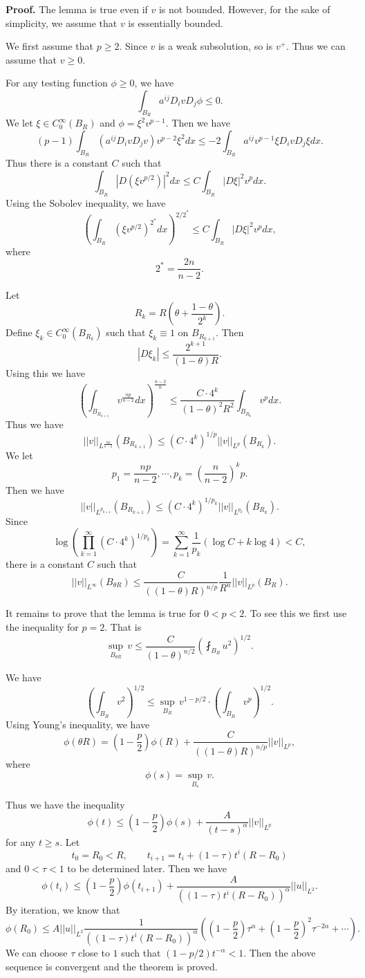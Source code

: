 {\bf Proof.} The lemma is true even if $v$ is not bounded. However, for the sake of simplicity, we assume that $v$ is essentially bounded.

We first assume that $p\geq 2$. Since $v$ is a weak subsolution, so is $v^+$. Thus we can assume that $v\geq 0$.

For any testing function $\phi\geq 0$, we have
\[
\int_{B_R} a^{ij}D_ivD_j\phi \leq 0.
\]
We let $\xi\in C_0^\infty(B_R)$ and $\phi=\xi^2v^{p-1}$. Then we have
\[
(p-1)\int_{B_R}(a^{ij} D_i v D_j v)v^{p-2}\xi^2 dx
\leq -2\int_{B_R}a^{ij} v^{p-1}\xi D_i v D_j\xi dx.
\]
Thus there is a constant $C$ such that
\[
\int_{B_R}|D(\xi v^{p/2})|^2 dx\leq C\int_{B_R}|D\xi|^2v^p dx.
\]
Using the Sobolev inequality, we have
\[
\left(\int_{B_R}(\xi v^{p/2})^{2^*} dx\right)^{2/2^*}\leq C\int_{B_R}|D\xi|^2 v^p dx,
\]
where 
\[
2^*=\frac{2n}{n-2}.
\]

Let 
\[
R_k=R\left(\theta+\frac{1-\theta}{2^k}\right).
\]
Define
$\xi_k\in C_0^\infty(B_{R_k})$ such that $\xi_k\equiv 1$ on $B_{R_{k+1}}$. Then
\[
|D\xi_k|\leq\frac{2^{k+1}}{(1-\theta) R}.
\]
Using this we have
\[
\left(\int_{B_{R_{k+1}}}v^{\frac{np}{n-2}}dx\right)^{\frac{n-2}{n}}\leq\frac{C\cdot 4^k}{(1-\theta)^2R^2}\int_{B_{R_k}}v^p dx.
\]
Thus we have
\[
||v||_{L^{\frac{np}{n-2}}}(B_{R_{k+1}})\leq (C\cdot 4^k)^{1/p}||v||_{L^p}(B_{R_k}).
\]
We let
\[
p_1=\frac{np}{n-2},\cdots, p_k=\left(\frac{n}{n-2}\right)^k p.
\]
Then we have
\[
||v||_{L^{p_{k+1}}}(B_{R_{k+1}})\leq (C\cdot 4^k)^{1/p_k}||v||_{L^{p_k}}(B_{R_k}).
\]
Since 
\[
\log\left(\prod_{k=1}^\infty (C\cdot 4^k)^{1/p_k}\right)
=\sum_{k=1}^\infty\frac{1}{p_k}(\log C+k\log 4)<C,
\]
there is a constant $C$ such that
\[
||v||_{L^\infty}(B_{\theta R})\leq\frac{C}{((1-\theta)R)^{n/p}}\frac{1}{R^n}||v||_{L^p}(B_R).
\]

It remains to prove that the lemma is true for $0<p<2$. To see this we first use the inequality for $p=2$. That is
\[
\sup_{B_{\theta R}}\, v\leq\frac{C}{(1-\theta)^{n/2}}\left(\fint_{B_R}u^2\right)^{1/2}.
\]

We have
\[
\left(\int_{B_R}v^2\right)^{1/2}\leq\sup_{B_R}\, v^{1-p/2}\cdot\left(\int_{B_R}v^p\right)^{1/2}.
\]
Using Young's inequality, we have
\[
\phi(\theta R)=(1-\frac p2)\phi(R)+\frac{C}{((1-\theta)R)^{n/p}}||v||_{L^p},
\]
where 
\[
\phi(s)=\sup_{B_s}\, v.
\]

Thus we have the inequality
\[
\phi(t)\leq (1-\frac p2)\phi(s)+\frac{A}{(t-s)^\alpha}||v||_{L^p}
\]
for any $t\geq s$. Let 
\[
t_0=R_0<R,\qquad t_{i+1}=t_i+(1-\tau)t^i(R-R_0)
\]
and $0<\tau<1$ to be determined later. Then we have
\[
\phi(t_i)\leq(1-\frac p2)\phi(t_{i+1})+\frac{A}{((1-\tau)t^i(R-R_0))^\alpha}||u||_{L^2}.
\]
By iteration, we know that
\[
\phi(R_0)\leq A||u||_{L^2}\frac{1}{((1-\tau)t^i(R-R_0))^\alpha}
\left((1-\frac p2)\tau^\alpha+(1-\frac p2)^2\tau^{-2\alpha}+\cdots\right).
\]
We can choose $\tau$ close to $1$ such that $(1-p/2)t^{-\alpha}<1$. Then the 
above sequence is convergent and the theorem is proved.


